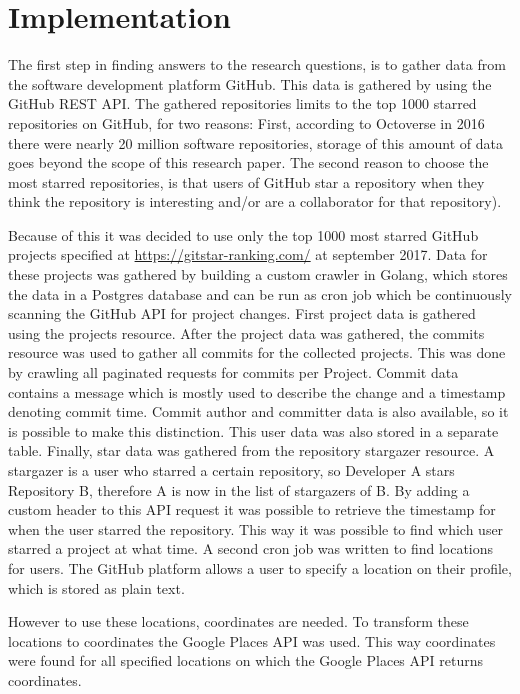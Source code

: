 \documentclass[acmtog, authorversion]{acmart}
\begin{document}
\section{Implementation}
The first step in finding answers to the research questions, is to gather data from the software development platform GitHub. 
This data is gathered by using the GitHub REST API\cite{GHAPI}. 
The gathered repositories limits to the top 1000 starred repositories on GitHub, for two reasons:
First, according to Octoverse \cite{GHOctoverse} in 2016 there were nearly 20 million software repositories, storage of this amount of data goes beyond the scope of this research paper.
The second reason to choose the most starred repositories, is that users of GitHub star a repository when they think the repository is interesting and/or are a collaborator for that repository).
 
Because of this it was decided to use only the top 1000 most starred GitHub projects specified at \url{https://gitstar-ranking.com/} at september 2017. 
Data for these projects was gathered by building a custom crawler in Golang, which stores the data in a Postgres database and can be run as cron job which be continuously scanning the GitHub API for project changes.
First project data is gathered using the projects resource\cite{GHAPI}.
After the project data was gathered, the commits resource\cite{GHAPI} was used to gather all commits for the collected projects. 
This was done by crawling all paginated requests for commits per Project. 
Commit data contains a message which is mostly used to describe the change and a timestamp denoting commit time.
Commit author and committer data is also available, so it is possible to make this distinction.
This user data was also stored in a separate table.
Finally, star data was gathered from the repository stargazer resource\cite{GHAPI}.
A stargazer is a user who starred a certain repository, so Developer A stars Repository B, therefore A is now in the list of stargazers of B.
By adding a custom header to this API request it was possible to retrieve the timestamp for when the user starred the repository.
This way it was possible to find which user starred a project at what time.
A second cron job was written to find locations for users. 
The GitHub platform allows a user to specify a location on their profile, which is stored as plain text.

However to use these locations, coordinates are needed. 
To transform these locations to coordinates the Google Places API was used. 
This way coordinates were found for all specified locations on which the Google Places API returns coordinates.
\end{document}
